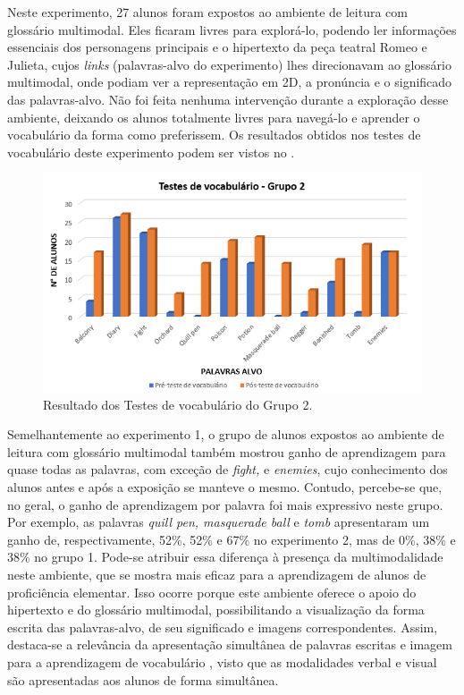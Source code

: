Neste experimento, 27 alunos foram expostos ao ambiente de leitura com
glossário multimodal. Eles ficaram livres para explorá-lo, podendo ler
informações essenciais dos personagens principais e o hipertexto da peça
teatral Romeo e Julieta, cujos \emph{links} (palavras-alvo do
experimento) lhes direcionavam ao glossário multimodal, onde podiam ver
a representação em 2D, a pronúncia e o significado das palavras-alvo.
Não foi feita nenhuma intervenção durante a exploração desse ambiente,
deixando os alunos totalmente livres para navegá-lo e aprender o
vocabulário da forma como preferissem. Os resultados obtidos nos testes
de vocabulário deste experimento podem ser vistos no .

\begin{figure}[htpb]
    \centering
    \begin{minipage}{.75\textwidth}
    \includegraphics[width=\textwidth]{graph-03.png}
    \caption{Resultado dos Testes de vocabulário do Grupo 2.}
    \label{graph-03}
    \end{minipage}
\end{figure}

Semelhantemente ao experimento 1, o grupo de alunos expostos ao ambiente
de leitura com glossário multimodal também mostrou ganho de aprendizagem
para quase todas as palavras, com exceção de \emph{fight,} e
\emph{enemies}, cujo conhecimento dos alunos antes e após a exposição se
manteve o mesmo. Contudo, percebe-se que, no geral, o ganho de
aprendizagem por palavra foi mais expressivo neste grupo. Por exemplo,
as palavras \emph{quill pen, masquerade ball} e \emph{tomb} apresentaram
um ganho de, respectivamente, 52\%, 52\% e 67\% no experimento 2, mas de
0\%, 38\% e 38\% no grupo 1. Pode-se atribuir essa diferença à presença
da multimodalidade neste ambiente, que se mostra mais eficaz para a
aprendizagem de alunos de proficiência elementar. Isso ocorre porque
este ambiente oferece o apoio do hipertexto e do glossário multimodal,
possibilitando a visualização da forma escrita das palavras-alvo, de seu
significado e imagens correspondentes. Assim, destaca-se a relevância da
apresentação simultânea de palavras escritas e imagem para a
aprendizagem de vocabulário \cite{mayer2001}, visto que as modalidades
verbal e visual são apresentadas aos alunos de forma simultânea.

